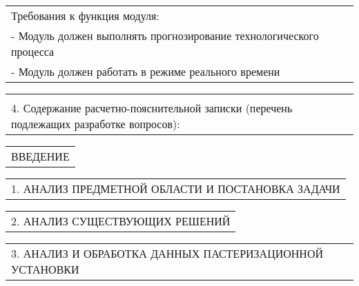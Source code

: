 \documentclass[12pt, А4, twoside]{article}
\begin{document}
\begin{FlushLeft}
    \begin{tabular}{p{17.25cm}} 
        \hspace{0.3cm} \textsf{Требования к функция модуля:} \vspace{1pt} \hline \\
        \hspace{0.6cm} \textsf{- Модуль должен выполнять прогнозирование технологического процесса}\vspace{1pt} \hline \\
        \hspace{0.6cm} \textsf{- Модуль должен работать в режиме реального времени}\vspace{1pt} \hline 
    \end{tabular}   

    \begin{tabular}{p{17.25cm}}
        \vspace{1pt} \hline \\
        \textsf{4. Содержание расчетно-пояснительной записки (перечень подлежащих разработке вопросов):} \vspace{1pt} \hline \\
    \end{tabular} 
    
    \begin{tabular}{p{17.25cm}} 
        \hspace{0.3cm} \textsf{ВВЕДЕНИЕ} \vspace{1pt} \hline \\
    \end{tabular} 

    \begin{tabular}{p{17.25cm}}
        \hspace{0.3cm} \textsf{1. АНАЛИЗ ПРЕДМЕТНОЙ ОБЛАСТИ И ПОСТАНОВКА ЗАДАЧИ} \vspace{1pt} \hline \\
    \end{tabular}  

    \begin{tabular}{p{17.25cm}} 
        \hspace{0.3cm} \textsf{2. АНАЛИЗ СУЩЕСТВУЮЩИХ РЕШЕНИЙ} \vspace{1pt} \hline \\
    \end{tabular} 

    \begin{tabular}{p{17.25cm}} 
        \hspace{0.3cm} \textsf{3. АНАЛИЗ И ОБРАБОТКА ДАННЫХ ПАСТЕРИЗАЦИОННОЙ УСТАНОВКИ} \vspace{1pt} \hline \\
    \end{tabular}    


\end{FlushLeft}
\end{document}
